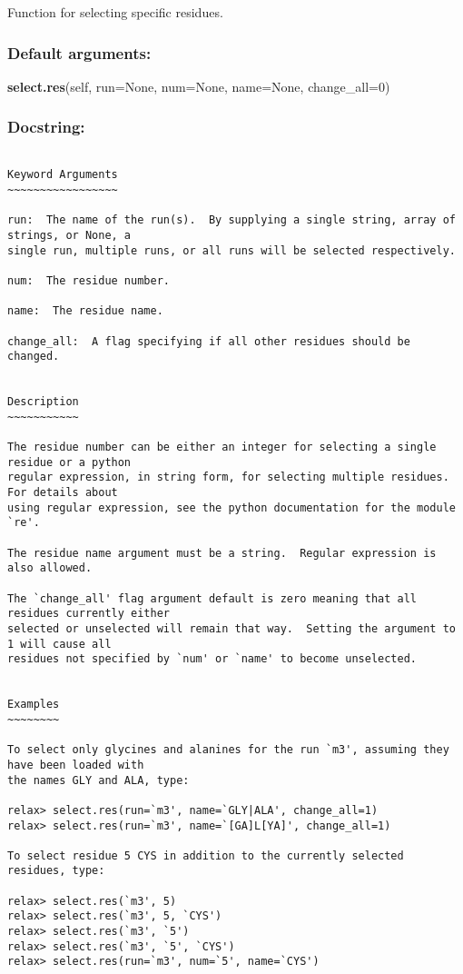 Function for selecting specific residues.

\subsubsection{Default arguments:}

\textsf{\textbf{select.res}(self, run=None, num=None, name=None, change\_all=0)
}


\subsubsection{Docstring:}

{\scriptsize
\begin{verbatim}

Keyword Arguments
~~~~~~~~~~~~~~~~~

run:  The name of the run(s).  By supplying a single string, array of strings, or None, a
single run, multiple runs, or all runs will be selected respectively.

num:  The residue number.

name:  The residue name.

change_all:  A flag specifying if all other residues should be changed.


Description
~~~~~~~~~~~

The residue number can be either an integer for selecting a single residue or a python
regular expression, in string form, for selecting multiple residues.  For details about
using regular expression, see the python documentation for the module `re'.

The residue name argument must be a string.  Regular expression is also allowed.

The `change_all' flag argument default is zero meaning that all residues currently either
selected or unselected will remain that way.  Setting the argument to 1 will cause all
residues not specified by `num' or `name' to become unselected.


Examples
~~~~~~~~

To select only glycines and alanines for the run `m3', assuming they have been loaded with
the names GLY and ALA, type:

relax> select.res(run=`m3', name=`GLY|ALA', change_all=1)
relax> select.res(run=`m3', name=`[GA]L[YA]', change_all=1)

To select residue 5 CYS in addition to the currently selected residues, type:

relax> select.res(`m3', 5)
relax> select.res(`m3', 5, `CYS')
relax> select.res(`m3', `5')
relax> select.res(`m3', `5', `CYS')
relax> select.res(run=`m3', num=`5', name=`CYS')
\end{verbatim}
}



